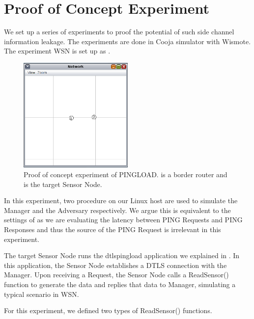 \section{Proof of Concept Experiment}

We set up a series of experiments to proof the potential of such side channel information leakage. The experiments are done in Cooja simulator with Wismote. The experiment WSN is set up as .

\begin{figure}
	\center
	\includegraphics[width=0.5\textwidth]{fig/PINGLOAD_PoC.png}
	\caption{Proof of concept experiment of PINGLOAD.  is a border router and  is the target Sensor Node.}
	\label{Fig: Proof of concept experiment of PINGLOAD}
\end{figure}

In this experiment, two procedure on our Linux host are used to simulate the Manager and the Adversary respectively. We argue this is equivalent to the settings of  as we are evaluating the latency between PING Requests and PING Responses and thus the source of the PING Request is irrelevant in this experiment.

The target Sensor Node runs the dtlspingload application we explained in . In this application, the Sensor Node establishes a DTLS connection with the Manager. Upon receiving a Request, the Sensor Node calls a ReadSensor() function to generate the data and replies that data to Manager, simulating a typical scenario in WSN. 

For this experiment, we defined two types of ReadSensor() functions. 

